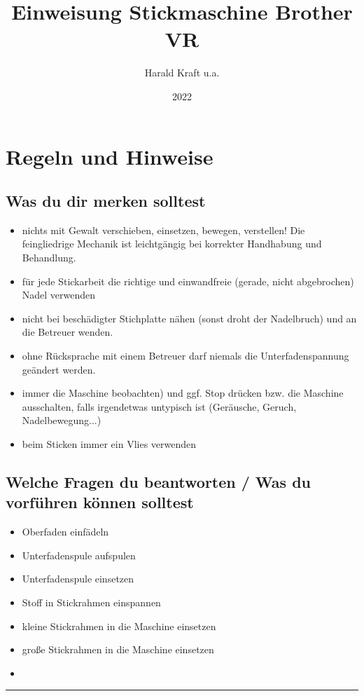 \documentclass{\basedir/fablab-document}
\date{2022}
\author{Harald Kraft u.a.}
\title{Einweisung Stickmaschine Brother VR}
\renewcommand{\todo}[1]{\textbf{\color{red}{TODO: #1}}}
\begin{document}
\maketitle
\todo{Das ist aktuell noch größtenteils die Einweisung für die alte Stickmaschine. Diese Einweisung ist daher noch nicht für den Produktiveinsatz freigegeben!}

\section{Regeln und Hinweise}
\subsection{Was du dir merken solltest}
\begin{itemize}
	\item nichts mit Gewalt verschieben, einsetzen, bewegen, verstellen! Die feingliedrige Mechanik ist leichtgängig bei korrekter Handhabung und Behandlung.
	\item für jede Stickarbeit die richtige und einwandfreie (gerade, nicht abgebrochen) Nadel verwenden
	\item nicht bei beschädigter Stichplatte nähen (sonst droht der Nadelbruch) und an die Betreuer wenden.
	\item ohne Rücksprache mit einem Betreuer darf niemals die Unterfadenspannung geändert werden.
	\item immer die Maschine beobachten) und ggf. Stop drücken bzw. die Maschine ausschalten, falls irgendetwas untypisch ist (Geräusche, Geruch, Nadelbewegung...)
	\item beim Sticken immer ein Vlies verwenden
\end{itemize}

\subsection{Welche Fragen du beantworten / Was du vorführen können solltest}
\begin{itemize}
	\item Oberfaden einfädeln
	\item Unterfadenspule aufspulen
	\item Unterfadenspule einsetzen
	\item Stoff in Stickrahmen einspannen
	\item kleine Stickrahmen in die Maschine einsetzen
	\item große Stickrahmen in die Maschine einsetzen
	\item 
\end{itemize}
\vspace{5em}
\hrule
\end{document}
